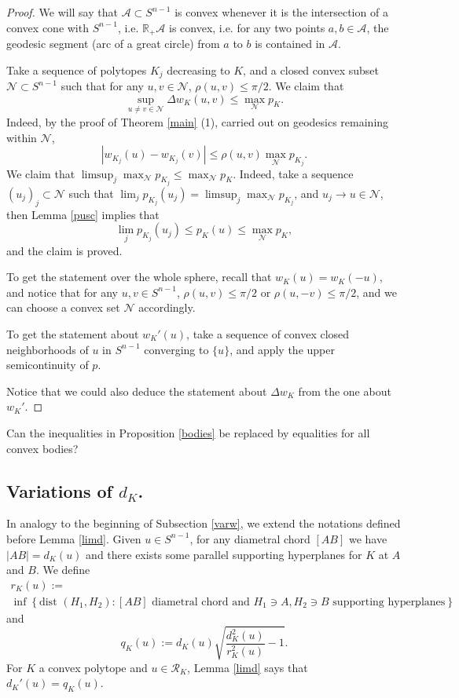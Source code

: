 \documentclass[a4paper,12pt]{amsart}
\def\R{\mathbb R}
\begin{document}
\begin{proof}
We will say that  $\mathcal A \subset S^{n-1}$ is
convex whenever it is the intersection of a convex cone with $S^{n-1}$,
i.e.  $\R_+ \mathcal A$ is convex, i.e. for any two points $a,b \in \mathcal A$,
the geodesic segment (arc of a great circle) from $a$ to $b$ is contained in $\mathcal A$.

Take a sequence of polytopes $K_j$ decreasing to $K$,
and a closed convex subset $\mathcal N \subset S^{n-1}$ such that
for any $u , v \in
\mathcal N$, $\rho(u,v)\le \pi/2$. We claim that
\[
\sup_{u\neq  v \in \mathcal N} \Delta w_K(u,v)\le \max_{\mathcal N} p_{K}.
\]
Indeed, by the proof of Theorem \ref{main} (1), carried out
on geodesics remaining within $\mathcal N$,
\[
| w_{K_j} (u) - w_{K_j} (v) | \le \rho(u,v) \max_{\mathcal N} p_{K_j} .
\]
We claim that $\limsup_j \max_{\mathcal N} p_{K_j} \le \max_{\mathcal N} p_{K}$.
Indeed, take a sequence $(u_j)_j \subset \mathcal N$ such that
$\lim_j p_{K_j}(u_j)= \limsup_j \max_{\mathcal N} p_{K_j}$, and
$u_j\to u \in \mathcal{N}$, then Lemma \ref{pusc} implies that
\[
\lim_j p_{K_j}(u_j) \le p_{K}(u) \le \max_{\mathcal N} p_{K},
\]
and the claim is proved.

To get the statement over the whole sphere, recall that $w_K(u)=w_K(-u)$, and notice that
for any $u,v \in S^{n-1}$, $\rho(u,v)\le \pi/2$ or $\rho(u,-v)\le \pi/2$,
and we can choose a convex set $\mathcal N$ accordingly.

To get the statement about $w_K'(u)$, take a sequence of convex closed
neighborhoods of $u$ in $S^{n-1}$ converging to $\{u\}$,
and apply the upper semicontinuity of $p$.

Notice that we could also deduce the statement about $\Delta w_K$ from
the one about $w_K'$.
\end{proof}

Can the  inequalities in  Proposition \ref{bodies} be replaced
by equalities for all convex bodies?

\subsection{Variations of $d_K$.}

In analogy to the beginning of Subsection \ref{varw}, we extend the notations
defined before Lemma \ref{limd}. Given $u\in S^{n-1}$, for any diametral
chord $[AB]$ we have $|AB|=d_K(u)$ and there exists some parallel
supporting hyperplanes for $K$ at $A$ and $B$. We define
\begin{multline*}
r_K (u) :=
\\
\inf \left\{ \mbox{dist }(H_1, H_2): [AB] \mbox{ diametral chord and }
H_1\ni A, H_2\ni B \mbox{ supporting hyperplanes}
\right\},
\end{multline*}
and
\[
q_K(u):=
d_K(u)\sqrt{\frac{d^2_K(u)}{r^2_K(u)}-1}.
\]
For $K$ a convex polytope and $u\in \mathcal R_K$, Lemma \ref{limd} says that $d_K'(u)= q_K(u)$.
\smallskip
\end{document}
